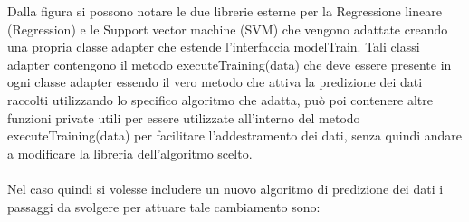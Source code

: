 \documentclass[../manuale-sviluppatore.tex]{subfiles}
\begin{document}
Dalla figura si possono notare le due librerie esterne per la Regressione lineare (Regression) e le Support vector machine (SVM) che vengono adattate creando una propria classe adapter che estende l'interfaccia modelTrain.
Tali classi adapter contengono il metodo executeTraining(data) che deve essere presente in ogni classe adapter essendo il vero metodo che attiva la predizione dei dati raccolti utilizzando lo specifico algoritmo che adatta, può poi contenere altre funzioni
private utili per essere utilizzate all'interno del metodo executeTraining(data) per facilitare l'addestramento dei dati, senza quindi andare a modificare la libreria dell'algoritmo scelto.
\\ \\
Nel caso quindi si volesse includere un nuovo algoritmo di predizione dei dati i passaggi da svolgere per attuare tale cambiamento sono:
\end{document}
